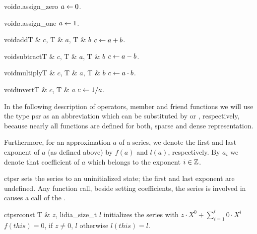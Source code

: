 \begin{fcode}{void}{$a$.assign_zero}{}
  $a \leftarrow 0$.
\end{fcode}

\begin{fcode}{void}{$a$.assign_one}{}
  $a \leftarrow 1$.
\end{fcode}

\begin{fcode}{void}{add}{T & $c$, T & $a$, T & $b$}
  $c \leftarrow a + b$.
\end{fcode}

\begin{fcode}{void}{subtract}{T & $c$, T & $a$, T & $b$}
  $c \leftarrow a - b$.
\end{fcode}

\begin{fcode}{void}{multiply}{T & $c$, T & $a$, T & $b$}
  $c \leftarrow a \cdot b$.
\end{fcode}

\begin{fcode}{void}{invert}{T & $c$, T & $a$}
  $c \leftarrow 1 / a$.
\end{fcode}

In the following description of operators, member and friend functions we will use the type psr
as an abbreviation which can be substituted by  or
, respectively, because nearly all functions are defined for both,
sparse and dense representation.

Furthermore, for an approximation $a$ of a series, we denote the first and last exponent of $a$
(as defined above) by $f(a)$ and $l(a)$, respectively.  By $a_{i}$ we denote that coefficient of
$a$ which belongs to the exponent $i \in \mathbb{Z}$.



\CONS

\begin{fcode}{ct}{psr}{}
  sets the series to an uninitialized state; the first and last exponent are undefined.  Any
  function call, beside setting coefficients, the series is involved in causes a call of the
  \LEH.
\end{fcode}

\begin{fcode}{ct}{psr}{const T & $z$, lidia_size_t $l$}
  initializes the series with $z \cdot X^0 + \sum_{i=1}^l 0 \cdot X^i$\\
  $f(this) = 0$, if $z \neq 0$, $l$ otherwise $l(this) = l$.
\end{fcode}

